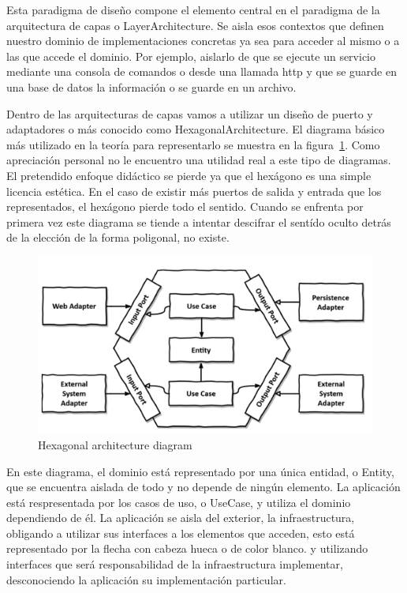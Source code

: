 Esta paradigma de diseño compone el elemento central en el paradigma de la arquitectura de capas o \gls{LayerArchitecture}. Se aisla esos contextos que definen nuestro dominio de implementaciones concretas ya sea para acceder al mismo o a las que accede el dominio. Por ejemplo, aislarlo de que se ejecute un servicio mediante una consola de comandos o desde una llamada http y que se guarde en una base de datos la información o se guarde en un archivo.

Dentro de las arquitecturas de capas vamos a utilizar un diseño de puerto y adaptadores o más conocido como \gls{HexagonalArchitecture}. El diagrama básico más utilizado en la teoría para representarlo se muestra en la figura~\cref{fig:hexagonalDiagram}. Como apreciación personal no le encuentro una utilidad real a este tipo de diagramas. El pretendido enfoque didáctico se pierde ya que el hexágono es una simple licencia estética. En el caso de existir más puertos de salida y entrada que los representados, el hexágono pierde todo el sentido. Cuando se enfrenta por primera vez este diagrama se tiende a intentar descifrar el sentído oculto detrás de la elección de la forma poligonal, no existe.

\begin{figure}[H]
    \centering
    \includegraphics[height=0.3\textheight]{./part/Ejecucion/Seguimiento/CreateTaskUseCase/img/HexagonalDiagram}
    \caption{Hexagonal architecture diagram\cite{TomHombergs2019GYHD}}\label{fig:hexagonalDiagram}
\end{figure}

En este diagrama, el dominio está representado por una única entidad, o Entity, que se encuentra aislada de todo y no depende de ningún elemento. La aplicación está respresentada por los casos de uso, o UseCase, y utiliza el dominio dependiendo de él. La aplicación se aisla del exterior, la infraestructura, obligando a utilizar sus interfaces a los elementos que acceden, esto está representado por la flecha con cabeza hueca o de color blanco. y utilizando interfaces que será responsabilidad de la infraestructura implementar, desconociendo la aplicación su implementación particular.

